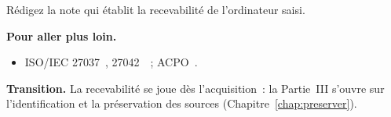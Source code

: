 \begin{boxexo}[title={\ding{45}\quad Exercice~6.10. Note de recevabilité \niveauexpert}]
Rédigez la note qui établit la recevabilité de l'ordinateur saisi.
\end{boxexo}

\bigskip

\begin{boxinfo}
\textbf{Pour aller plus loin.}
\begin{itemize}
    \item ISO/IEC 27037~\cite{iso27037}, 27042~\cite{iso27042}~;
          ACPO~\cite{acpo2012}.
\end{itemize}
\end{boxinfo}

\begin{boxinfo}
\textbf{Transition.} La recevabilité se joue dès l'acquisition~: la
Partie~III s'ouvre sur l'identification et la préservation des sources
(Chapitre~\ref{chap:preserver}).
\end{boxinfo}

